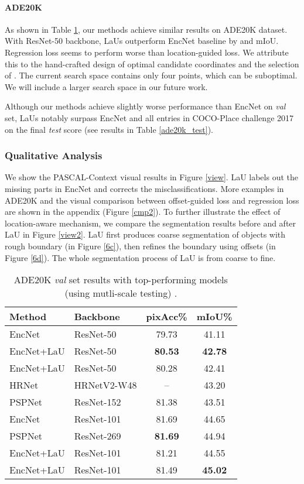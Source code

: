 \documentclass[10pt,twocolumn,letterpaper]{article}
\begin{document}
\paragraph{ADE20K} As shown in Table \ref{ade20k_val}, our methods achieve similar results on ADE20K dataset. With ResNet-50 backbone, LaUs outperform EncNet baseline by  and  mIoU. Regression loss seems to perform worse than location-guided loss. We attribute this to the hand-crafted design of optimal candidate coordinates and the selection of . The current search space contains only four points, which can be suboptimal. We will include a larger search space in our future work.

Although our methods achieve slightly worse performance than EncNet on \textit{val} set, LaUs notably surpass EncNet and all entries in COCO-Place challenge 2017 on the final \textit{test} score (see results in Table \ref{ade20k_test}).

\subsubsection{Qualitative Analysis}
We show the PASCAL-Context visual results in Figure \ref{view}. LaU labels out the missing parts in EncNet and corrects the misclassifications. More examples in ADE20K and the visual comparison between offset-guided loss and regression loss are shown in the appendix (Figure \ref{cmp2}). To further illustrate the effect of location-aware mechanism, we compare the segmentation results before and after LaU in Figure \ref{view2}. LaU first produces coarse segmentation of objects with rough boundary (in Figure \ref{6c}), then refines the boundary using offsets (in Figure \ref{6d}). The whole segmentation process of LaU is from coarse to fine.

\begin{table}
  \caption{ADE20K \textit{val} set results with top-performing models (using mutli-scale testing) .}
  \label{sample-table}
  \centering
\begin{tabular}{llcc}
\hline    
Method    & Backbone & pixAcc\%  & mIoU\%\\
\hline  \hline  
EncNet \cite{EncNet} & ResNet-50 & 79.73 & 41.11 \\
EncNet+LaU & ResNet-50 & \textbf{80.53} & \textbf{42.78} \\
EncNet+LaU & ResNet-50 & 80.28 & 42.41 \\
\hline
HRNet \cite{HRR} & HRNetV2-W48  & -- & 43.20\\
PSPNet \cite{PSPNet} & ResNet-152 & 81.38 & 43.51\\
EncNet \cite{EncNet} & ResNet-101 & 81.69 & 44.65\\
PSPNet \cite{PSPNet} & ResNet-269 & \textbf{81.69} & 44.94\\
EncNet+LaU & ResNet-101 & 81.21 & 44.55 \\
EncNet+LaU & ResNet-101 & 81.49  & \textbf{45.02} \\
\hline  
  \end{tabular}
\label{ade20k_val}
\end{table}
\end{document}
